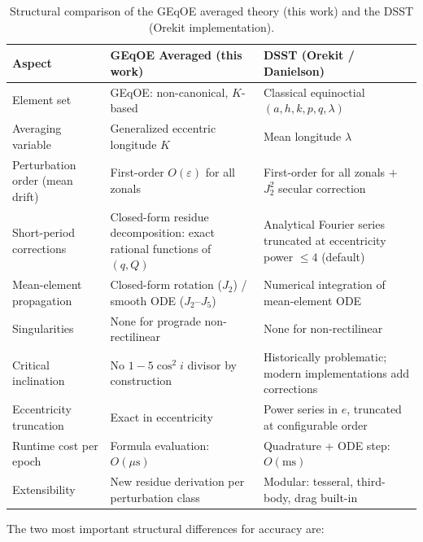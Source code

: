 \documentclass[11pt]{article}
\begin{document}
\begin{table}[ht]
\centering
\caption{Structural comparison of the GEqOE averaged theory (this work)
and the DSST (Orekit implementation).}
\label{tab:structural_comparison}
\small
\begin{tabular}{@{}p{4cm}p{5.2cm}p{5.2cm}@{}}
\toprule
Aspect & GEqOE Averaged (this work) & DSST (Orekit / Danielson) \\
\midrule
Element set & GEqOE: non-canonical, $K$-based & Classical equinoctial $(a,h,k,p,q,\lambda)$ \\
Averaging variable & Generalized eccentric longitude $K$ & Mean longitude $\lambda$ \\
Perturbation order (mean drift) & First-order $O(\varepsilon)$ for all zonals & First-order for all zonals $+$ $J_2^2$ secular correction \\
Short-period corrections & Closed-form residue decomposition: exact rational functions of $(q, Q)$ & Analytical Fourier series truncated at eccentricity power $\leq 4$ (default) \\
Mean-element propagation & Closed-form rotation ($J_2$) / smooth ODE ($J_2$--$J_5$) & Numerical integration of mean-element ODE \\
Singularities & None for prograde non-rectilinear & None for non-rectilinear \\
Critical inclination & No $1-5\cos^2 i$ divisor by construction & Historically problematic; modern implementations add corrections \\
Eccentricity truncation & Exact in eccentricity & Power series in $e$, truncated at configurable order \\
Runtime cost per epoch & Formula evaluation: $O(\mu\text{s})$ & Quadrature + ODE step: $O(\text{ms})$ \\
Extensibility & New residue derivation per perturbation class & Modular: tesseral, third-body, drag built-in \\
\bottomrule
\end{tabular}
\end{table}

The two most important structural differences for accuracy are:
\end{document}
